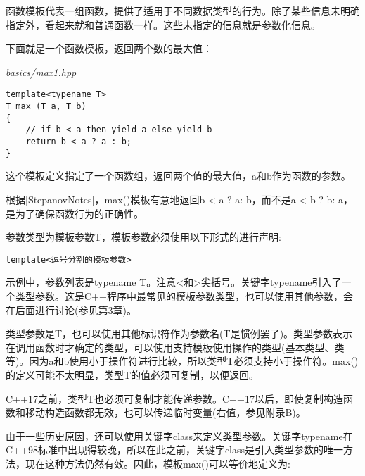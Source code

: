 

函数模板代表一组函数，提供了适用于不同数据类型的行为。除了某些信息未明确指定外，看起来就和普通函数一样。这些未指定的信息就是参数化信息。


下面就是一个函数模板，返回两个数的最大值：

\noindent
\textit{basics/max1.hpp}
\begin{lstlisting}[style=styleCXX]
template<typename T>
T max (T a, T b)
{
	// if b < a then yield a else yield b
	return b < a ? a : b;
}
\end{lstlisting}

这个模板定义指定了一个函数组，返回两个值的最大值，a和b作为函数的参数。

\begin{tcolorbox}[colback=webgreen!5!white,colframe=webgreen!75!black]
\hspace*{0.75cm}根据[StepanovNotes]，max()模板有意地返回b < a ? a: b，而不是a < b ? b: a，是为了确保函数行为的正确性。
\end{tcolorbox}

参数类型为模板参数T，模板参数必须使用以下形式的进行声明:

\begin{lstlisting}[style=styleCXX]
template<逗号分割的模板参数>
\end{lstlisting}

示例中，参数列表是typename T。注意<和>尖括号。关键字typename引入了一个类型参数。这是C++程序中最常见的模板参数类型，也可以使用其他参数，会在后面进行讨论(参见第3章)。

类型参数是T，也可以使用其他标识符作为参数名(T是惯例罢了)。类型参数表示在调用函数时才确定的类型，可以使用支持模板使用操作的类型(基本类型、类等)。因为a和b使用小于操作符进行比较，所以类型T必须支持小于操作符。max()的定义可能不太明显，类型T的值必须可复制，以便返回。

\begin{tcolorbox}[colback=webgreen!5!white,colframe=webgreen!75!black]
\hspace*{0.75cm}C++17之前，类型T也必须可复制才能传递参数。C++17以后，即使复制构造函数和移动构造函数都无效，也可以传递临时变量(右值，参见附录B)。
\end{tcolorbox}

由于一些历史原因，还可以使用关键字class来定义类型参数。关键字typename在C++98标准中出现得较晚，所以在此之前，关键字class是引入类型参数的唯一方法，现在这种方法仍然有效。因此，模板max()可以等价地定义为:

